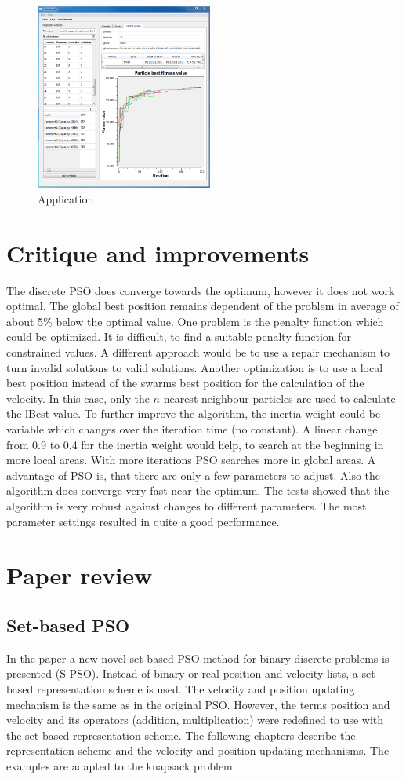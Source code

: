 \documentclass{article}
\begin{document}
\begin{figure}[H]
    \centering
    \includegraphics[width=220px]{images/image_main.PNG}
    \caption{Application}
    \label{fig-app}
\end{figure}

\section{Critique and improvements}
\label{lbl-impr}
The discrete PSO does converge towards the optimum, however it does not work optimal. The global best position remains dependent of the problem in average of about 5\% below the optimal value. One problem is the penalty function which could be optimized. It is difficult, to find a suitable penalty function for constrained values. A different approach would be to use a repair mechanism to turn invalid solutions to valid solutions. Another optimization is to use a local best position instead of the swarms best position for the calculation of the velocity. In this case, only the $n$ nearest neighbour particles are used to calculate the lBest value. To further improve the algorithm, the inertia weight could be variable which changes over the iteration time (no constant). A linear change from 0.9 to 0.4 for the inertia weight would help, to search at the beginning in more local areas. With more iterations PSO searches more in global areas. A advantage of PSO is, that there are only a few parameters to adjust. Also the algorithm does converge very fast near the optimum. The tests showed that the algorithm is very robust against changes to different parameters. The most parameter settings resulted in quite a good performance.

\section{Paper review}
\label{lbl-rev}
\subsection{Set-based PSO}
In the paper \cite{bib-sets} a new novel set-based PSO method for binary discrete problems is presented (S-PSO). Instead of binary or real position and velocity lists, a set-based representation scheme is used. The velocity and position updating mechanism is the same as in the original PSO. However, the terms position and velocity and its operators (addition, multiplication) were redefined to use with the set based representation scheme. The following chapters describe the representation scheme and the velocity and position updating mechanisms. The examples are adapted to the knapsack problem.
\end{document}
